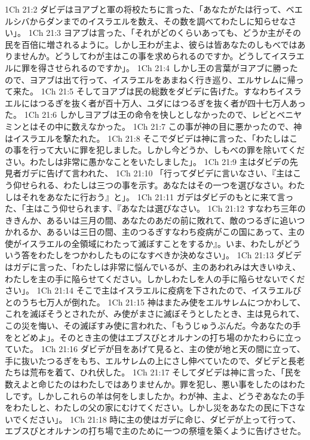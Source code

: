 1Ch 21:2  ダビデはヨアブと軍の将校たちに言った、「あなたがたは行って、ベエルシバからダンまでのイスラエルを数え、その数を調べてわたしに知らせなさい」。
1Ch 21:3  ヨアブは言った、「それがどのくらいあっても、どうか主がその民を百倍に増されるように。しかし王わが主よ、彼らは皆あなたのしもべではありませんか。どうしてわが主はこの事を求められるのですか。どうしてイスラエルに罪を得させられるのですか」。
1Ch 21:4  しかし王の言葉がヨアブに勝ったので、ヨアブは出て行って、イスラエルをあまねく行き巡り、エルサレムに帰って来た。
1Ch 21:5  そしてヨアブは民の総数をダビデに告げた。すなわちイスラエルにはつるぎを抜く者が百十万人、ユダにはつるぎを抜く者が四十七万人あった。
1Ch 21:6  しかしヨアブは王の命令を快しとしなかったので、レビとベニヤミンとはその中に数えなかった。
1Ch 21:7  この事が神の目に悪かったので、神はイスラエルを撃たれた。
1Ch 21:8  そこでダビデは神に言った、「わたしはこの事を行って大いに罪を犯しました。しかし今どうか、しもべの罪を除いてください。わたしは非常に愚かなことをいたしました」。
1Ch 21:9  主はダビデの先見者ガデに告げて言われた、
1Ch 21:10  「行ってダビデに言いなさい、『主はこう仰せられる、わたしは三つの事を示す。あなたはその一つを選びなさい。わたしはそれをあなたに行おう』と」。
1Ch 21:11  ガデはダビデのもとに来て言った、「主はこう仰せられます、『あなたは選びなさい。
1Ch 21:12  すなわち三年のききんか、あるいは三月の間、あなたのあだの前に敗れて、敵のつるぎに追いつかれるか、あるいは三日の間、主のつるぎすなわち疫病がこの国にあって、主の使がイスラエルの全領域にわたって滅ぼすことをするか』。いま、わたしがどういう答をわたしをつかわしたものになすべきか決めなさい」。
1Ch 21:13  ダビデはガデに言った、「わたしは非常に悩んでいるが、主のあわれみは大きいゆえ、わたしを主の手に陥らせてください。しかしわたしを人の手に陥らせないでください」。
1Ch 21:14  そこで主はイスラエルに疫病を下されたので、イスラエルびとのうち七万人が倒れた。
1Ch 21:15  神はまたみ使をエルサレムにつかわして、これを滅ぼそうとされたが、み使がまさに滅ぼそうとしたとき、主は見られて、この災を悔い、その滅ぼすみ使に言われた、「もうじゅうぶんだ。今あなたの手をとどめよ」。そのとき主の使はエブスびとオルナンの打ち場のかたわらに立っていた。
1Ch 21:16  ダビデが目をあげて見ると、主の使が地と天の間に立って、手に抜いたつるぎをもち、エルサレムの上にさし伸べていたので、ダビデと長老たちは荒布を着て、ひれ伏した。
1Ch 21:17  そしてダビデは神に言った、「民を数えよと命じたのはわたしではありませんか。罪を犯し、悪い事をしたのはわたしです。しかしこれらの羊は何をしましたか。わが神、主よ、どうぞあなたの手をわたしと、わたしの父の家にむけてください。しかし災をあなたの民に下さないでください」。
1Ch 21:18  時に主の使はガデに命じ、ダビデが上って行って、エブスびとオルナンの打ち場で主のために一つの祭壇を築くように告げさせた。
